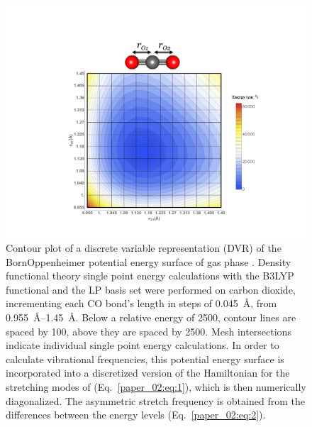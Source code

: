 \documentclass[%
  class = book,%
  crop = false,%
  float = true,%
  multi = true,%
  preview = false,%
]{standalone}
\begin{document}
\begin{figure}
  \centering
  \includegraphics[scale=0.75]{Fig1.pdf}
  \caption[DVR contour plot]{Contour plot of a discrete variable representation (DVR) of the Born\textendash{}Oppenheimer potential energy surface of gas phase . Density functional theory single point energy calculations with the B3LYP functional and the LP basis set were performed on carbon dioxide, incrementing each CO bond's length in steps of \SI{0.045}{\angstrom}, from \SIrange{0.955}{1.45}{\angstrom}. Below a relative energy of \SI{2500}{\wavenumber}, contour lines are spaced by \SI{100}{\wavenumber}, above they are spaced by \SI{2500}{\wavenumber}. Mesh intersections indicate individual single point energy calculations. In order to calculate vibrational frequencies, this potential energy surface is incorporated into a discretized version of the Hamiltonian for the stretching modes of  (Eq.~\ref{paper_02:eq:1}), which is then numerically diagonalized. The asymmetric stretch frequency is obtained from the differences between the energy levels (Eq.~\ref{paper_02:eq:2}).}
  \label{paper_02:fig:1}
\end{figure}

\section[\texorpdfstring{\caps{Frequency Dependence on Model Approximations}}{Frequency Dependence on Model Approximations}]{\texorpdfstring{}{Sensitivity of the Calculated Vibrational Signatures to the Underlying Computational and Chemical Model}}
\label{paper_02:sec:III}
\end{document}
